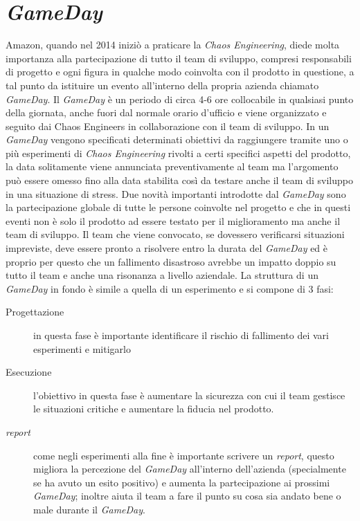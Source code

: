 \section{\textit{GameDay}}
Amazon, quando nel 2014 iniziò a praticare la \textit{Chaos Engineering}, diede molta importanza alla partecipazione di tutto il team di sviluppo, compresi responsabili di progetto e ogni figura in qualche modo coinvolta con il prodotto in questione, a tal punto da istituire un evento all'interno della propria azienda chiamato \textit{GameDay}.
Il \textit{GameDay} è un periodo di circa 4-6 ore collocabile in qualsiasi punto della giornata, anche fuori dal normale orario d'ufficio e viene organizzato e seguito dai Chaos Engineers in collaborazione con il team di sviluppo.
In un \textit{GameDay} vengono specificati determinati obiettivi da raggiungere tramite uno o più esperimenti di \textit{Chaos Engineering} rivolti a certi specifici aspetti del prodotto, la data solitamente viene annunciata preventivamente al team ma l'argomento può essere omesso fino alla data stabilita così da testare anche il team di sviluppo in una situazione di stress.
Due novità importanti introdotte dal \textit{GameDay} sono la partecipazione globale di tutte le persone coinvolte nel progetto e che in questi eventi non è solo il prodotto ad essere testato per il miglioramento ma anche il team di sviluppo.
Il team che viene convocato, se dovessero verificarsi situazioni impreviste, deve essere pronto a risolvere entro la durata del \textit{GameDay} ed è proprio per questo che un fallimento disastroso avrebbe un impatto doppio su tutto il team e anche una risonanza a livello aziendale.
La struttura di un \textit{GameDay} in fondo è simile a quella di un esperimento e si compone di 3 fasi:
\begin{description}
    \item[Progettazione] in questa fase è importante identificare il rischio di fallimento dei vari esperimenti e mitigarlo
    \item[Esecuzione] l'obiettivo in questa fase è aumentare la sicurezza con cui il team gestisce le situazioni critiche e aumentare la fiducia nel prodotto.
    \item[\textit{report}] come negli esperimenti alla fine è importante scrivere un \textit{report}, questo migliora la percezione del \textit{GameDay} all'interno dell'azienda (specialmente se ha avuto un esito positivo) e aumenta la partecipazione ai prossimi \textit{GameDay}; inoltre aiuta il team a fare il punto su cosa sia andato bene o male durante il \textit{GameDay}.
\end{description}

